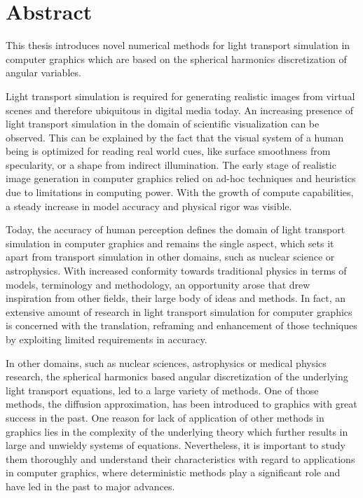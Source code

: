\chapter*{Abstract}
%
%
This thesis introduces novel numerical methods for light transport simulation in computer graphics which are based on the spherical harmonics discretization of angular variables.

Light transport simulation is required for generating realistic images from virtual scenes and therefore ubiquitous in digital media today. An increasing presence of light transport simulation in the domain of scientific visualization can be observed. This can be explained by the fact that the visual system of a human being is optimized for reading real world cues, like surface smoothness from specularity, or a shape from indirect illumination. The early stage of realistic image generation in computer graphics relied on ad-hoc techniques and heuristics due to limitations in computing power. With the growth of compute capabilities, a steady increase in model accuracy and physical rigor was visible.

Today, the accuracy of human perception defines the domain of light transport simulation in computer graphics and remains the single aspect, which sets it apart from transport simulation in other domains, such as nuclear science or astrophysics. With increased conformity towards traditional physics in terms of models, terminology and methodology, an opportunity arose that drew inspiration from other fields, their large body of ideas and methods. In fact, an extensive amount of research in light transport simulation for computer graphics is concerned with the translation, reframing and enhancement of those techniques by exploiting limited requirements in accuracy.

In other domains, such as nuclear sciences, astrophysics or medical physics research, the spherical harmonics based angular discretization of the underlying light transport equations, led to a large variety of methods. One of those methods, the diffusion approximation, has been introduced to graphics with great success in the past. One reason for lack of application of other methods in graphics lies in the complexity of the underlying theory which further results in large and unwieldy systems of equations. Nevertheless, it is important to study them thoroughly and understand their characteristics with regard to applications in computer graphics, where deterministic methods play a significant role and have led in the past to major advances.

